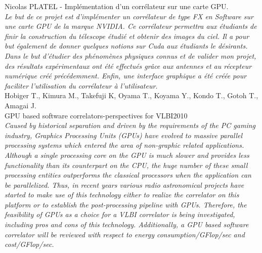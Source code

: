 \noindent
{\large Nicolas PLATEL - Implémentation d’un corrélateur sur une carte GPU.  }\\
\indent \textit{Le but de ce projet est d’implémenter un corrélateur de type FX en Software sur une carte GPU de la marque NVIDIA. Ce corrélateur permettra aux étudiants de finir la construction du télescope étudié et obtenir des images du ciel. Il a pour but également de donner quelques notions sur Cuda aux étudiants le désirants. Dans le but d’étudier des phénomènes physiques connus et de valider mon projet, des résultats expérimentaux ont été effectués grâce aux antennes et au récepteur numérique créé précédemment. Enfin, une interface graphique a été créée pour faciliter l’utilisation du corrélateur à l’utilisateur.
}\\

\noindent
{\large Hobiger T., Kimura M., Takefuji K, Oyama T., Koyama Y., Kondo T., Gotoh T., Amagai J. \hfill \\ GPU based software correlators-perspectives for VLBI2010 }\\
\indent \textit{Caused by historical separation and driven by the requirements of the PC gaming 
industry, Graphics Processing Units (GPUs) have evolved to massive parallel processing 
systems which entered the area of non-graphic related applications. Although a single 
processing core on the GPU is much slower and provides less functionality than its 
counterpart on the CPU, the huge number of these small processing entities outperforms 
the classical processors when the application can be parallelized. Thus, in  
recent years various radio astronomical projects have started to make use of this 
technology either to realize the correlator on this platform or to establish the 
post-processing pipeline with GPUs. Therefore, the feasibility of GPUs as a choice 
for a VLBI correlator is being investigated, including pros and cons of this technology. 
Additionally, a GPU based software correlator will be reviewed with respect to 
energy consumption/GFlop/sec and cost/GFlop/sec. 
}\\


